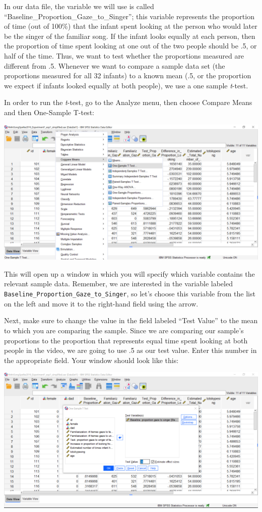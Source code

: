 \documentclass[
]{book}
\begin{document}
In our data file, the variable we will use is called ``Baseline\_Proportion\_Gaze\_to\_Singer''; this variable represents the proportion of time (out of 100\%) that the infant spent looking at the person who would later be the singer of the familiar song. If the infant looks equally at each person, then the proportion of time spent looking at one out of the two people should be .5, or half of the time. Thus, we want to test whether the proportions measured are different from .5. Whenever we want to compare a sample data set (the proportions measured for all 32 infants) to a known mean (.5, or the proportion we expect if infants looked equally at both people), we use a one sample \emph{t}-test.

In order to run the \emph{t}-test, go to the {Analyze} menu, then choose {Compare Means} and then {One-Sample T-test}:

\includegraphics{img/6.4.14.png}

This will open up a window in which you will specify which variable contains the relevant sample data. Remember, we are interested in the variable labeled \texttt{Baseline\_Proportion\_Gaze\_to\_Singer}, so let's choose this variable from the list on the left and move it to the right-hand field using the arrow.

Next, make sure to change the value in the field labeled ``Test Value'' to the mean to which you are comparing the sample. Since we are comparing our sample's proportions to the proportion that represents equal time spent looking at both people in the video, we are going to use .5 as our test value. Enter this number in the appropriate field. Your window should look like this:

\includegraphics{img/6.4.15.png}
\end{document}
